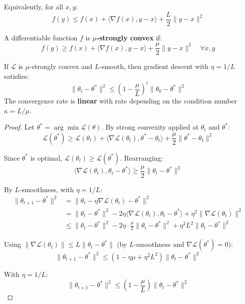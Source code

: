\documentclass[main.tex]{subfiles}
\begin{document}
Equivalently, for all $x, y$:
$$f(y) \leq f(x) + \langle \nabla f(x), y - x \rangle + \frac{L}{2}\|y - x\|^2$$

\begin{definition}
A differentiable function $f$ is \textbf{$\mu$-strongly convex} if:
$$f(y) \geq f(x) + \langle \nabla f(x), y - x \rangle + \frac{\mu}{2}\|y - x\|^2 \quad \forall x, y$$
\end{definition}

\begin{theorem}
If $\mathcal{L}$ is $\mu$-strongly convex and $L$-smooth, then gradient descent with $\eta = 1/L$ satisfies:
$$\|\theta_t - \theta^*\|^2 \leq \left(1 - \frac{\mu}{L}\right)^t \|\theta_0 - \theta^*\|^2$$
The convergence rate is \textbf{linear} with rate depending on the condition number $\kappa = L/\mu$.
\end{theorem}

\begin{proof}
Let $\theta^* = \arg\min \mathcal{L}(\theta)$. By strong convexity applied at $\theta_t$ and $\theta^*$:
$$\mathcal{L}(\theta^*) \geq \mathcal{L}(\theta_t) + \langle \nabla \mathcal{L}(\theta_t), \theta^* - \theta_t \rangle + \frac{\mu}{2}\|\theta^* - \theta_t\|^2$$

Since $\theta^*$ is optimal, $\mathcal{L}(\theta_t) \geq \mathcal{L}(\theta^*)$. Rearranging:
$$\langle \nabla \mathcal{L}(\theta_t), \theta_t - \theta^* \rangle \geq \frac{\mu}{2}\|\theta_t - \theta^*\|^2$$

By $L$-smoothness, with $\eta = 1/L$:
\begin{align}
\|\theta_{t+1} - \theta^*\|^2 &= \|\theta_t - \eta\nabla\mathcal{L}(\theta_t) - \theta^*\|^2 \\[6pt]
&= \|\theta_t - \theta^*\|^2 - 2\eta\langle \nabla\mathcal{L}(\theta_t), \theta_t - \theta^*\rangle + \eta^2\|\nabla\mathcal{L}(\theta_t)\|^2 \\[6pt]
&\leq \|\theta_t - \theta^*\|^2 - 2\eta\cdot\frac{\mu}{2}\|\theta_t - \theta^*\|^2 + \eta^2 L^2 \|\theta_t - \theta^*\|^2
\end{align}

Using $\|\nabla\mathcal{L}(\theta_t)\| \leq L\|\theta_t - \theta^*\|$ (by $L$-smoothness and $\nabla\mathcal{L}(\theta^*) = 0$):
$$\|\theta_{t+1} - \theta^*\|^2 \leq (1 - \eta\mu + \eta^2 L^2)\|\theta_t - \theta^*\|^2$$

With $\eta = 1/L$:
$$\|\theta_{t+1} - \theta^*\|^2 \leq \left(1 - \frac{\mu}{L}\right)\|\theta_t - \theta^*\|^2$$
\end{proof}
\end{document}
